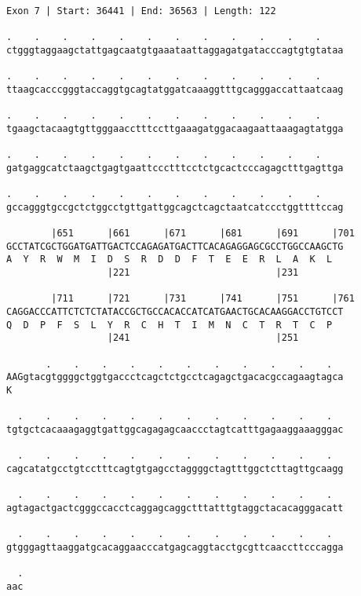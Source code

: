 \documentclass{article}
\begin{document}
\begin{Verbatim}[fontfamily=courier]
Exon 7 | Start: 36441 | End: 36563 | Length: 122

.    .    .    .    .    .    .    .    .    .    .    .    
ctgggtaggaagctattgagcaatgtgaaataattaggagatgatacccagtgtgtataa

.    .    .    .    .    .    .    .    .    .    .    .    
ttaagcacccgggtaccaggtgcagtatggatcaaaggtttgcagggaccattaatcaag

.    .    .    .    .    .    .    .    .    .    .    .    
tgaagctacaagtgttgggaacctttccttgaaagatggacaagaattaaagagtatgga

.    .    .    .    .    .    .    .    .    .    .    .    
gatgaggcatctaagctgagtgaattccctttcctctgcactcccagagctttgagttga

.    .    .    .    .    .    .    .    .    .    .    .    
gccagggtgccgctctggcctgttgattggcagctcagctaatcatccctggttttccag

        |651      |661      |671      |681      |691      |701
GCCTATCGCTGGATGATTGACTCCAGAGATGACTTCACAGAGGAGCGCCTGGCCAAGCTG
A  Y  R  W  M  I  D  S  R  D  D  F  T  E  E  R  L  A  K  L  
                  |221                          |231        

        |711      |721      |731      |741      |751      |761
CAGGACCCATTCTCTCTATACCGCTGCCACACCATCATGAACTGCACAAGGACCTGTCCT
Q  D  P  F  S  L  Y  R  C  H  T  I  M  N  C  T  R  T  C  P  
                  |241                          |251        

       .    .    .    .    .    .    .    .    .    .    .  
AAGgtacgtggggctggtgaccctcagctctgcctcagagctgacacgccagaagtagca
K                                                           

  .    .    .    .    .    .    .    .    .    .    .    .  
tgtgctcacaaagaggtgattggcagagagcaaccctagtcatttgagaaggaaagggac

  .    .    .    .    .    .    .    .    .    .    .    .  
cagcatatgcctgtcctttcagtgtgagcctaggggctagtttggctcttagttgcaagg

  .    .    .    .    .    .    .    .    .    .    .    .  
agtagactgactcgggccacctcaggagcaggctttatttgtaggctacacagggacatt

  .    .    .    .    .    .    .    .    .    .    .    .  
gtgggagttaaggatgcacaggaacccatgagcaggtacctgcgttcaaccttcccagga

  .
aac
\end{Verbatim}
\newpage
\end{document}
